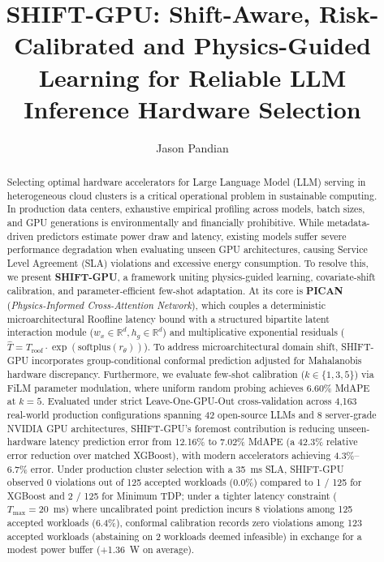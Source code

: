 \documentclass[preprint,12pt]{elsarticle}
\begin{document}
\begin{frontmatter}

\title{SHIFT-GPU: Shift-Aware, Risk-Calibrated and Physics-Guided Learning for Reliable LLM Inference Hardware Selection}

\author[inst1]{Jason Pandian}



\begin{abstract}
Selecting optimal hardware accelerators for Large Language Model (LLM) serving in heterogeneous cloud clusters is a critical operational problem in sustainable computing. In production data centers, exhaustive empirical profiling across models, batch sizes, and GPU generations is environmentally and financially prohibitive. While metadata-driven predictors estimate power draw and latency, existing models suffer severe performance degradation when evaluating unseen GPU architectures, causing Service Level Agreement (SLA) violations and excessive energy consumption. To resolve this, we present \textbf{SHIFT-GPU}, a framework uniting physics-guided learning, covariate-shift calibration, and parameter-efficient few-shot adaptation. At its core is \textbf{PICAN} (\textit{Physics-Informed Cross-Attention Network}), which couples a deterministic microarchitectural Roofline latency bound with a structured bipartite latent interaction module ($w_x \in \mathbb{R}^d, h_g \in \mathbb{R}^d$) and multiplicative exponential residuals ($\hat{T} = T_{\text{roof}} \cdot \exp(\text{softplus}(r_\theta))$). To address microarchitectural domain shift, SHIFT-GPU incorporates group-conditional conformal prediction adjusted for Mahalanobis hardware discrepancy. Furthermore, we evaluate few-shot calibration ($k \in \{1, 3, 5\}$) via FiLM parameter modulation, where uniform random probing achieves 6.60\% MdAPE at $k=5$. Evaluated under strict Leave-One-GPU-Out cross-validation across 4,163 real-world production configurations spanning 42 open-source LLMs and 8 server-grade NVIDIA GPU architectures, SHIFT-GPU's foremost contribution is reducing unseen-hardware latency prediction error from 12.16\% to 7.02\% MdAPE (a 42.3\% relative error reduction over matched XGBoost), with modern accelerators achieving 4.3\%--6.7\% error. Under production cluster selection with a 35~ms SLA, SHIFT-GPU observed 0 violations out of 125 accepted workloads (0.0\%) compared to 1 / 125 for XGBoost and 2 / 125 for Minimum TDP; under a tighter latency constraint ($T_{\max} = 20$~ms) where uncalibrated point prediction incurs 8 violations among 125 accepted workloads (6.4\%), conformal calibration records zero violations among 123 accepted workloads (abstaining on 2 workloads deemed infeasible) in exchange for a modest power buffer (+1.36~W on average).
\end{abstract}


\end{frontmatter}
\end{document}

